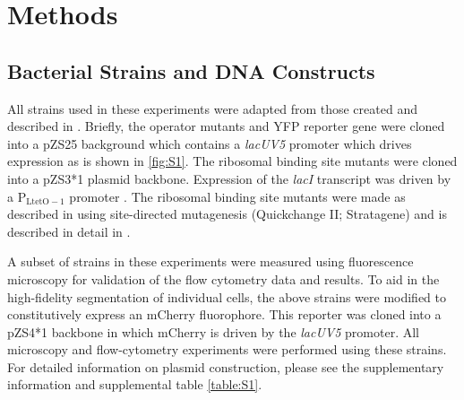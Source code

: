\pagebreak
\section*{Methods }

\subsection*{Bacterial Strains and DNA Constructs}
All strains used in these experiments were adapted from those created and
described in \citep{Garcia2011}. Briefly, the operator mutants and YFP reporter
gene were cloned into a pZS25 background which contains a \textit{lacUV5}
promoter which drives expression as is shown in \ref{fig:S1}. The ribosomal
binding site mutants were cloned into a pZS3*1 plasmid backbone. Expression of
the \textit{lacI} transcript was driven by a P$_\mathrm{LtetO-1}$ promoter
\cite{Lutz1997}. The ribosomal binding site mutants were made as described in
\citep{Salis2009} using site-directed mutagenesis (Quickchange II; Stratagene)
and is described in detail in \citep{Garcia2011}.

A subset of strains in these experiments were measured using fluorescence
microscopy for validation of the flow cytometry data and results. To aid in the
high-fidelity segmentation of individual cells, the above strains were
modified to constitutively express an mCherry fluorophore. This reporter was
cloned into a pZS4*1 backbone in which mCherry is driven by the \textit{lacUV5} promoter.
All microscopy and flow-cytometry experiments were performed using these
strains. For detailed information on plasmid construction, please see the
supplementary information and supplemental table \ref{table:S1}.


